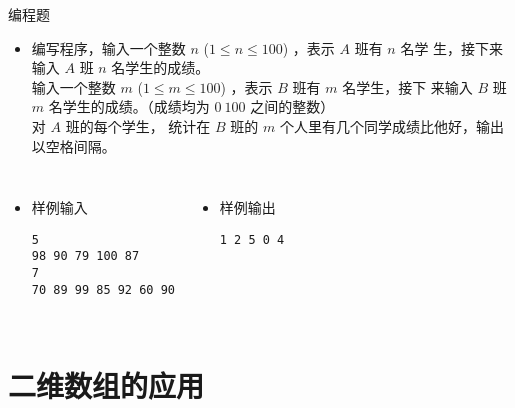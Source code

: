 \begin{frame}[fragile]
{{\begin{itemize}
            \end{itemize}

        }{
            \begin{exampleblock}{编程题}

                \begin{itemize}
                    \item 编写程序，输入一个整数 $n$ ($1 \le n \le 100$) ，表示 $A$ 班有 $n$ 名学 生，接下来输入 $A$ 班 $n$ 名学生的成绩。\\
                        输入一个整数 $m$ ($1 \le m \le 100$) ，表示 $B$ 班有 $m$ 名学生，接下 来输入 $B$ 班 $m$ 名学生的成绩。（成绩均为 $0~100$ 之间的整数）\\
                        对 $A$ 班的每个学生， 统计在 $B$ 班的 $m$ 个人里有几个同学成绩比他好，输出以空格间隔。
                \end{itemize}

                \begin{columns}[onlytextwidth,T]
                    \begin{itemize}
                        \item 样例输入

                            \lstinline|5|\\
                            \lstinline|98 90 79 100 87|\\
                            \lstinline|7|\\
                            \lstinline|70 89 99 85 92 60 90|

                    \end{itemize}

                    \begin{itemize}
                        \item 样例输出

                            \lstinline|1 2 5 0 4|

                    \end{itemize}
                \end{columns}

            \end{exampleblock}
        }
    }
\end{frame}


\section{二维数组的应用}

